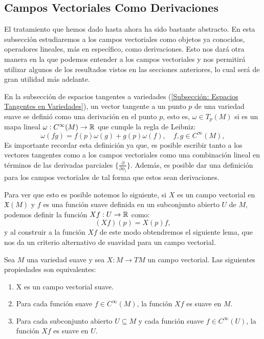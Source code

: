 \subsection{Campos Vectoriales Como Derivaciones}\label{Subsección: Campos Vectoriales Como Derivaciones}

El tratamiento que hemos dado hasta ahora ha sido bastante abstracto. En esta subsección estudiaremos a los campos vectoriales como objetos ya conocidos, operadores lineales, más en específico, como derivaciones. Esto nos dará otra manera en la que podemos entender a los campos vectoriales y nos permitirá utilizar algunos de los resultados vistos en las secciones anteriores, lo cual será de gran utilidad más adelante.

En la subsección de espacios tangentes a variedades (\ref{Subsección: Espacios Tangentes en Variedades}), un vector tangente a un punto $p$ de una variedad suave se definió como una derivación en el punto $p$, esto es, $\omega \in T_p(M)$ si es un mapa lineal $\omega: C^{\infty}(M) \to \mathbb{R}$ que cumple la regla de Leibniz:
\[
	\omega(fg) = f(p)\omega(g) + g(p) \omega(f), \quad f,g \in C^{\infty}(M),
\]
Es importante recordar esta definición ya que, es posible escribir tanto a los vectores tangentes como a los campos vectoriales como una combinación lineal en términos de las derivadas parciales $\{\frac{\partial}{\partial \phi_i}\}$. Además, es posible dar una definición para los campos vectoriales de tal forma que estos sean derivaciones.

Para ver que esto es posible notemos lo siguiente, si $X$ es un campo vectorial en $\mathfrak{X}(M)$ y $f$ es una función suave definida en un subconjunto abierto $U$ de $M$, podemos definir la función $Xf: U \to \mathbb{R}$ como:
\[
	(Xf)(p) = X(p)f,
\]
y al construir a la función $Xf$ de este modo obtendremos el siguiente lema, que nos da un criterio alternativo de suavidad para un campo vectorial.

\begin{lemma}
	Sea $M$ una variedad suave y sea $X:M \to TM$ un campo vectorial. Las siguientes propiedades son equivalentes:
	\begin{enumerate}
		\item X es un campo vectorial suave.
		\item Para cada función suave $f \in C^{\infty}(M)$, la función $Xf$ es suave en $M$.
		\item Para cada subconjunto abierto $U \subseteq M$ y cada función suave $f \in C^{\infty}(U)$, la función $Xf$ es suave en $U$.
	\end{enumerate}
\end{lemma}

